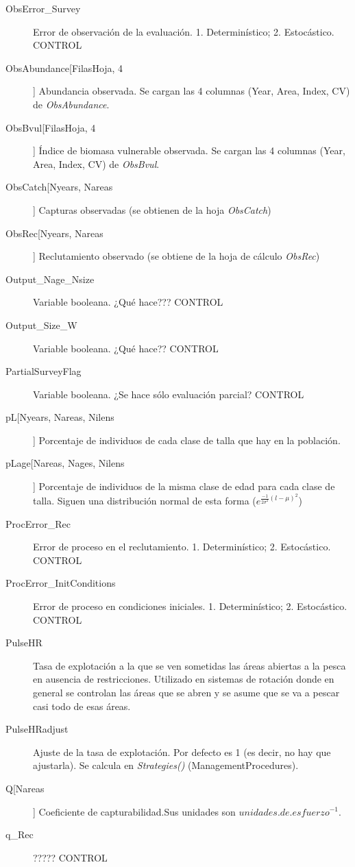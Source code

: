 \documentclass[12pt, oneside, a4paper]{article}
\begin{document}
\begin{description}
		
		\item[ObsError\_Survey] Error de observación de la evaluación. 1. Determinístico; 2. Estocástico. CONTROL
		\item[ObsAbundance[FilasHoja, 4]] Abundancia observada. Se cargan las 4 columnas (Year, Area, Index, CV) de \emph{ObsAbundance}.
		\item[ObsBvul[FilasHoja, 4]] Índice de biomasa vulnerable observada. Se cargan las 4 columnas (Year, Area, Index, CV) de \emph{ObsBvul}.
		\item[ObsCatch[Nyears, Nareas]] Capturas observadas (se obtienen de la hoja \emph{ObsCatch})
		\item[ObsRec[Nyears, Nareas]] Reclutamiento observado (se obtiene de la hoja de cálculo \emph{ObsRec})
		\item[Output\_Nage\_Nsize] Variable booleana. ¿Qué hace??? CONTROL
		\item[Output\_Size\_W] Variable booleana. ¿Qué hace?? CONTROL
		
		\item[PartialSurveyFlag] Variable booleana. ¿Se hace sólo evaluación parcial? CONTROL
		\item[pL[Nyears, Nareas, Nilens]] Porcentaje de individuos de cada clase de talla que hay en la población.
		\item[pLage[Nareas, Nages, Nilens]] Porcentaje de individuos de la misma clase de edad para cada clase de talla. Siguen una distribución normal de esta forma ($e^{\frac{-1}{2 \sigma^2} (l-\mu)^2}$)		
		\item[ProcError\_Rec] Error de proceso en el reclutamiento. 1. Determinístico; 2. Estocástico. CONTROL
		\item[ProcError\_InitConditions] Error de proceso en condiciones iniciales. 1. Determinístico; 2. Estocástico. CONTROL
		\item[PulseHR] Tasa de explotación a la que se ven sometidas las áreas abiertas a la pesca en ausencia de restricciones. Utilizado en sistemas de rotación donde en general se controlan las áreas que se abren y se asume que se va a pescar casi todo de esas áreas. 
		\item[PulseHRadjust] Ajuste de la tasa de explotación. Por defecto es 1 (es decir, no hay que ajustarla). Se calcula en \emph{Strategies()} (ManagementProcedures).
		   
		\item[Q[Nareas]] Coeficiente de capturabilidad.Sus unidades son $unidades.de.esfuerzo^{-1}$.
		\item[q\_Rec] ????? CONTROL
		

\end{description}
\end{document}
